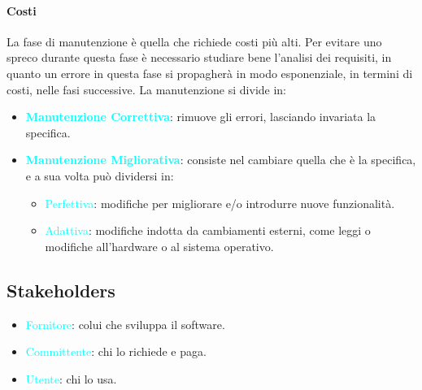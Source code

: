     \paragraph{Costi} 
    La fase di manutenzione è quella che richiede costi più alti. 
    Per evitare uno spreco durante questa fase è necessario studiare bene l'analisi dei requisiti, in quanto un errore in questa fase
    si propagherà in modo esponenziale, in termini di costi, nelle fasi successive.
    \break
    \break
    La manutenzione si divide in:
    \begin{itemize}
        \item \textbf{\textcolor{cyan}{Manutenzione Correttiva}}: rimuove gli errori, lasciando invariata la specifica.
        \item \textbf{\textcolor{cyan}{Manutenzione Migliorativa}}: consiste nel cambiare quella che è la specifica, e a sua volta può dividersi in:
            \begin{itemize}
                \item \textcolor{cyan}{Perfettiva}: modifiche per migliorare e/o introdurre nuove funzionalità.
                \item \textcolor{cyan}{Adattiva}: modifiche indotta da cambiamenti esterni, come leggi o modifiche all'hardware o al sistema operativo.
            \end{itemize}
    \end{itemize}
    \subsection*{Stakeholders}
        \begin{itemize}
            \item \textcolor{cyan}{Fornitore}: colui che sviluppa il software.
            \item \textcolor{cyan}{Committente}: chi lo richiede e paga.
            \item \textcolor{cyan}{Utente}: chi lo usa.
        \end{itemize}